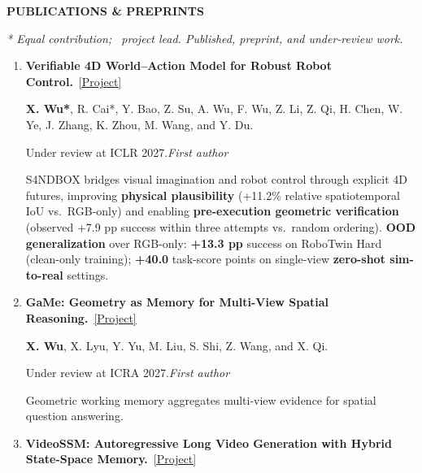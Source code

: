 \documentclass[a4paper]{article}
\newcommand{\cvsection}[1]{%
  \par\vspace{2.0pt}%
  {\color{cvblue}\fontsize{11}{12.2}\selectfont\bfseries\MakeUppercase{#1}}\par
  \vspace{-4pt}{\color{cvblue}\rule{\textwidth}{0.4pt}}\par\vspace{1.0pt}%
}
\newcommand{\pubgroup}[1]{%
  \par\vspace{2.0pt}{\color{cvblue}\fontsize{9.4}{10.4}\selectfont\bfseries #1}\par
}
\newcommand{\pubnote}[1]{\par{\color{cvgray}#1}}
\begin{document}
\cvsection{Publications \& Preprints}
{\fontsize{9}{9.65}\selectfont
\textit{* Equal contribution; \textdagger\ project lead. Published, preprint, and under-review work.}\par
\pubgroup{First- and Co-first-author Work}
\begin{enumerate}[leftmargin=1.6em,labelsep=0.38em,itemsep=0.4pt,topsep=1.3pt,parsep=0pt,partopsep=0pt]
\item \textbf{Verifiable 4D World--Action Model for Robust Robot Control.}~\href{https://candy-crusher.github.io/xiaoshanwu.github.io/projects/sandbox/}{\textcolor{cvblue}{[Project]}}\par
\textbf{X. Wu*}, R. Cai*, Y. Bao, Z. Su, A. Wu, F. Wu, Z. Li, Z. Qi, H. Chen, W. Ye, J. Zhang, K. Zhou, M. Wang, and Y. Du.\par
Under review at ICLR 2027.\hfill\textcolor{cvblue}{\textit{First author}}
\pubnote{S4NDBOX bridges visual imagination and robot control through explicit 4D futures, improving \textbf{physical plausibility} (+11.2\% relative spatiotemporal IoU vs.\ RGB-only) and enabling \textbf{pre-execution geometric verification} (observed +7.9 pp success within three attempts vs.\ random ordering).} \textbf{OOD generalization} over RGB-only: \textbf{+13.3 pp} success on RoboTwin Hard (clean-only training); \textbf{+40.0} task-score points on single-view \textbf{zero-shot sim-to-real} settings.
\item \textbf{GaMe: Geometry as Memory for Multi-View Spatial Reasoning.}~\href{https://candy-crusher.github.io/xiaoshanwu.github.io/projects/game/}{\textcolor{cvblue}{[Project]}}\par
\textbf{X. Wu}, X. Lyu, Y. Yu, M. Liu, S. Shi, Z. Wang, and X. Qi.\par
Under review at ICRA 2027.\hfill\textcolor{cvblue}{\textit{First author}}
\pubnote{Geometric working memory aggregates multi-view evidence for spatial question answering.}
\item \textbf{VideoSSM: Autoregressive Long Video Generation with Hybrid State-Space Memory.}~\href{https://candy-crusher.github.io/xiaoshanwu.github.io/projects/videossm/}{\textcolor{cvblue}{[Project]}}\par

\end{enumerate}}
\end{document}
